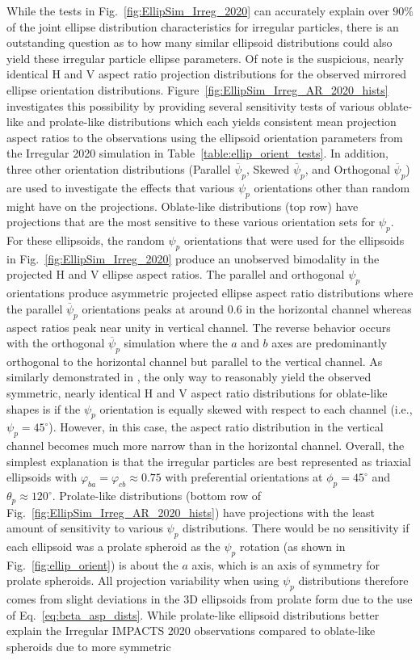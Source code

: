 \documentclass[amt, manuscript]{copernicus}
\begin{document}
While the tests in Fig.~\ref{fig:EllipSim_Irreg_2020} can accurately explain over $90\%$ of the joint ellipse distribution characteristics for irregular particles, there is an outstanding question as to how many similar ellipsoid distributions could also yield these irregular particle ellipse parameters. Of note is the suspicious, nearly identical H and V aspect ratio projection distributions for the observed mirrored ellipse orientation distributions. Figure~\ref{fig:EllipSim_Irreg_AR_2020_hists} investigates this possibility by providing several sensitivity tests of various oblate-like and prolate-like distributions which each yields consistent mean projection aspect ratios to the observations  using the ellipsoid orientation parameters from the Irregular 2020 simulation in Table~\ref{table:ellip_orient_tests}. In addition, three other orientation distributions (Parallel $\overline{\psi}_{p}$, Skewed $\overline{\psi}_{p}$, and Orthogonal $\overline{\psi}_{p}$) are used to investigate the effects that various $\psi_{p}$ orientations other than random might have on the projections. Oblate-like distributions (top row) have projections that are the most sensitive to these various orientation sets for $\psi_{p}$. For these ellipsoids, the random $\psi_{p}$ orientations that were used for the ellipsoids in Fig.~\ref{fig:EllipSim_Irreg_2020} produce an unobserved bimodality in the projected H and V ellipse aspect ratios. The parallel and orthogonal $\psi_{p}$ orientations produce asymmetric projected ellipse aspect ratio distributions where the parallel $\overline{\psi}_{p}$ orientations peaks at around 0.6 in the horizontal channel whereas aspect ratios peak near unity in vertical channel. The reverse behavior occurs with the orthogonal $\overline{\psi}_{p}$ simulation where the $a$ and $b$ axes are predominantly orthogonal to the horizontal channel but parallel to the vertical channel. As similarly demonstrated in \citet{Dunnavan2022}, the only way to reasonably yield the observed symmetric, nearly identical H and V aspect ratio distributions for oblate-like shapes is if the $\psi_{p}$ orientation is equally skewed with respect to each channel (i.e., $\psi_{p}=45^{\circ}$). However, in this case, the aspect ratio distribution in the vertical channel becomes much more narrow than in the horizontal channel. Overall, the simplest explanation is that the irregular particles are best represented as triaxial ellipsoids with $\varphi_{ba}=\varphi_{cb}\approx 0.75$ with preferential orientations at $\phi_{p} = 45^{\circ}$ and $\theta_{p} \approx 120^{\circ}$. Prolate-like distributions (bottom row of Fig.~\ref{fig:EllipSim_Irreg_AR_2020_hists}) have projections with the least amount of sensitivity to various $\psi_{p}$ distributions. There would be no sensitivity if each ellipsoid was a prolate spheroid as the $\psi_{p}$ rotation (as shown in Fig.~\ref{fig:ellip_orient}) is about the $a$ axis, which is an axis of symmetry for prolate spheroids. All projection variability when using $\psi_{p}$ distributions therefore comes from slight deviations in the 3D ellipsoids from prolate form due to the use of Eq.~\ref{eq:beta_asp_dists}.  While prolate-like ellipsoid distributions better explain the Irregular IMPACTS 2020 observations compared to oblate-like spheroids due to more symmetric 
\end{document}
